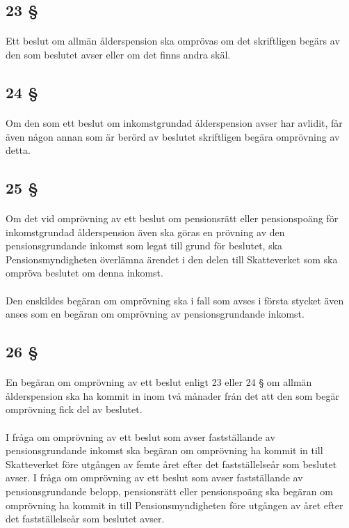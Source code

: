 \documentclass[a4paper,notitlepage,openany,10pt]{book}
\begin{document}
\subsection*{23 §}
\paragraph*{}
Ett beslut om allmän ålderspension ska omprövas om det skriftligen begärs av den som beslutet avser eller om det finns andra skäl.
\subsection*{24 §}
\paragraph*{}
Om den som ett beslut om inkomstgrundad ålderspension avser har avlidit, får även någon annan som är berörd av beslutet skriftligen begära omprövning av detta.
\subsection*{25 §}
\paragraph*{}
Om det vid omprövning av ett beslut om pensionsrätt eller pensionspoäng för inkomstgrundad ålderspension även ska göras en prövning av den pensionsgrundande inkomst som legat till grund för beslutet, ska Pensionsmyndigheten överlämna ärendet i den delen till Skatteverket som ska ompröva beslutet om denna inkomst.
\paragraph*{}
Den enskildes begäran om omprövning ska i fall som avses i första stycket även anses som en begäran om omprövning av pensionsgrundande inkomst.
\subsection*{26 §}
\paragraph*{}
En begäran om omprövning av ett beslut enligt 23 eller 24 § om allmän ålderspension ska ha kommit in inom två månader från det att den som begär omprövning fick del av beslutet.
\paragraph*{}
I fråga om omprövning av ett beslut som avser fastställande av pensionsgrundande inkomst ska begäran om omprövning ha kommit in till Skatteverket före utgången av femte året efter det fastställelseår som beslutet avser.
I fråga om omprövning av ett beslut som avser fastställande av pensionsgrundande belopp, pensionsrätt eller pensionspoäng ska begäran om omprövning ha kommit in till Pensionsmyndigheten före utgången av året efter det fastställelseår som beslutet avser.
\end{document}
